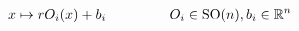 \documentclass[preview]{standalone}
\begin{document}
\begin{align*}
x \mapsto r O_i(x) + b_i \;\hspace{1.5 cm} O_i \in \text{SO}(n), b_i \in \mathbb{R}^n \\
\end{align*}
\end{document}

